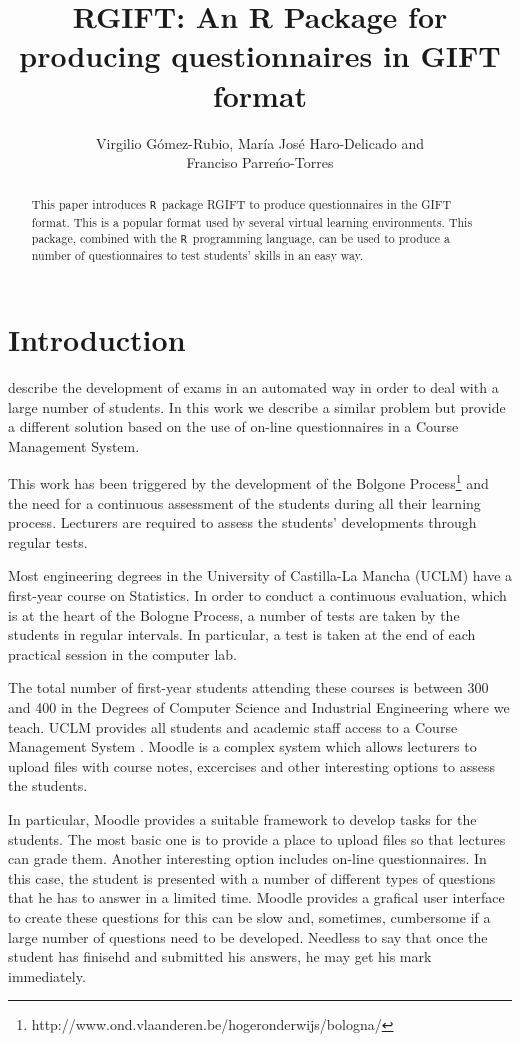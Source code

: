 \documentclass[a4paper]{article}
\title{RGIFT: An R Package for producing questionnaires in GIFT format}
\author{Virgilio Gómez-Rubio, María José Haro-Delicado and\\ Franciso Parreńo-Torres}
\newcommand{\RR}{\texttt{R}\ }
\newcommand{\pkg}[1]{\textsf{#1}}
\begin{document}
\maketitle


\begin{abstract}
This paper introduces \RR package \pkg{RGIFT} to produce questionnaires in the
GIFT format. This is a popular format used by several virtual learning
environments. This package, combined with the \RR programming language, can be
used to produce a number of questionnaires to test students' skills in an easy
way.


\end{abstract}


\section{Introduction}


\citet{ZeileisBettina:2009} describe the development of exams in an automated
way in order to deal with a large number of students. In this work we describe
a similar problem but provide a different solution based on the use
of on-line questionnaires in a Course Management System.

This work has been triggered by the development of the Bolgone Process\footnote{http://www.ond.vlaanderen.be/hogeronderwijs/bologna/}
and the need for a continuous assessment of the students during all their
learning process. Lecturers are required to assess the students' developments
through regular tests.

Most engineering degrees in the University of Castilla-La Mancha (UCLM)
have a first-year course on Statistics. In order to conduct a continuous
evaluation, which is at the heart of the Bologne Process, a number of tests are
taken by the students in regular intervals. In particular, a test is taken at
the end of each practical session in the computer lab. 

The total number of first-year students attending these courses is between 300
and 400 in the Degrees of Computer Science and Industrial Engineering where we
teach. UCLM provides all students and academic staff access to a Course
Management System \citet{Moodle}. Moodle is a complex system which allows
lecturers to upload files with course notes, excercises and other interesting
options to assess the students.

In particular, Moodle provides a suitable framework to develop tasks for the
students. The most basic one is to provide a place to upload files so that
lectures can grade them. Another interesting option includes on-line
questionnaires.  In this case, the student is presented with a number of
different types of questions that he has to answer in a limited time. Moodle
provides a grafical user interface to create these questions for this can be
slow and, sometimes, cumbersome if a large number of questions need to be
developed. Needless to say that once the student has finisehd and submitted his
answers, he may get his mark immediately.
\end{document}
